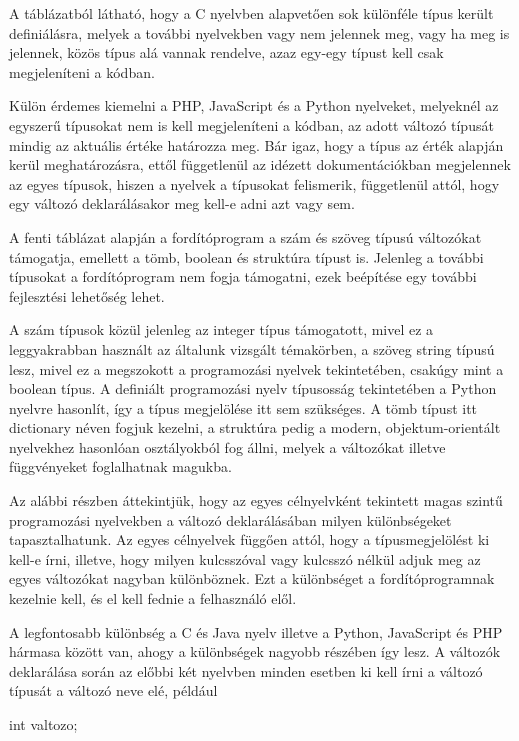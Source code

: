 
A táblázatból látható, hogy a C nyelvben alapvetően sok különféle típus került definiálásra, melyek a további nyelvekben vagy nem jelennek meg, vagy ha meg is jelennek, közös típus alá vannak rendelve, azaz egy-egy típust kell csak megjeleníteni a kódban.

Külön érdemes kiemelni a PHP, JavaScript és a Python nyelveket, melyeknél az egyszerű típusokat nem is kell megjeleníteni a kódban, az adott változó típusát mindig az aktuális értéke határozza meg. Bár igaz, hogy a típus az érték alapján kerül meghatározásra, ettől függetlenül az idézett dokumentációkban megjelennek az egyes típusok, hiszen a nyelvek a típusokat felismerik, függetlenül attól, hogy egy változó deklarálásakor meg kell-e adni azt vagy sem.

A fenti táblázat alapján a fordítóprogram a szám és szöveg típusú változókat támogatja, emellett a tömb, boolean és struktúra típust is. Jelenleg a további típusokat a fordítóprogram nem fogja támogatni, ezek beépítése egy további fejlesztési lehetőség lehet.

A szám típusok közül jelenleg az integer típus támogatott, mivel ez a leggyakrabban használt az általunk vizsgált témakörben, a szöveg string típusú lesz, mivel ez a megszokott a programozási nyelvek tekintetében, csakúgy mint a boolean típus. A definiált programozási nyelv típusosság tekintetében a Python nyelvre hasonlít, így a típus megjelölése itt sem szükséges.
A tömb típust itt dictionary néven fogjuk kezelni, a struktúra pedig a modern, objektum-orientált nyelvekhez hasonlóan osztályokból fog állni, melyek a változókat illetve függvényeket foglalhatnak magukba.


Az alábbi részben áttekintjük, hogy az egyes célnyelvként tekintett magas szintű programozási nyelvekben a változó deklarálásában milyen különbségeket tapasztalhatunk. Az egyes célnyelvek függően attól, hogy a típusmegjelölést ki kell-e írni, illetve, hogy milyen kulcsszóval vagy kulcsszó nélkül adjuk meg az egyes változókat nagyban különböznek. Ezt a különbséget a fordítóprogramnak kezelnie kell, és el kell fednie a felhasználó elől.

A legfontosabb különbség a C és Java nyelv illetve a Python, JavaScript és PHP hármasa között van, ahogy a különbségek nagyobb részében így lesz. A változók deklarálása során az előbbi két nyelvben minden esetben ki kell írni a változó típusát a változó neve elé, például
\begin{cpp}
	int valtozo;
\end{cpp}

